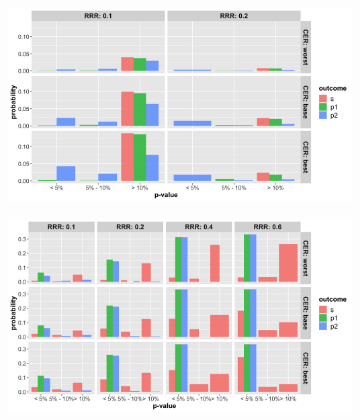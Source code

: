 \documentclass[]{article}
\begin{document}
\begin{figure}
\centering
  \caption{Probability that the p-value (from Fisher’s exact test) at termination of the trial is below 5\%, between 5\%
  and 10\% and greater than 10\% for cases where trial was (a) stopped for futility; (b) stopped for superiority. The
  rows represent the three control even rate scenarios and the columns present the relative risk reduction
  scenarios. Note: the denominator in each figure is the number of simulations (not the number of trials stopped for
  futility (a) or superiority (b), and thus, the proportions do not add up to 100\% within one figure. Further, (a) and
  (b) do not include simulations where the trial went to the max. allowed sample size. The bars should be interpreted
  with respect to the relative proportion that fit in each category.}
  \begin{subfigure}{0.8\textwidth}
    \centering
    \caption{}
    \includegraphics{../p1_plots/batch_size_nb_3000/pvalue_fut_p1.png}
  \end{subfigure}
  \bigbreak
  \begin{subfigure}{0.8\textwidth}
    \centering
    \caption{}
    \includegraphics{../p1_plots/batch_size_nb_3000/pvalue_sup_p1.png}
  \end{subfigure}
\end{figure}
\end{document}
